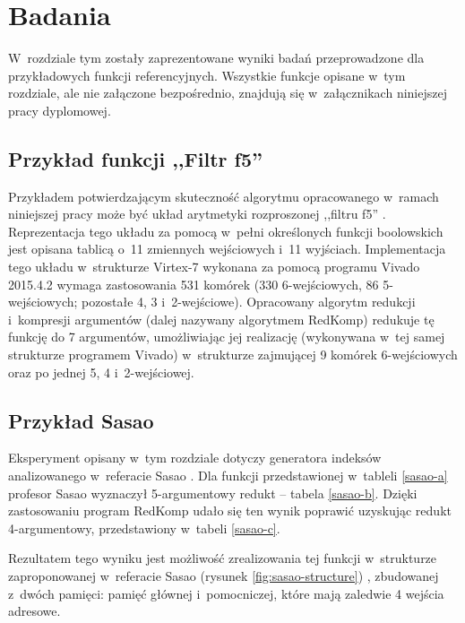\chapter{Badania}
\label{chapter:research}

W~rozdziale tym zostały zaprezentowane wyniki badań przeprowadzone dla przykładowych funkcji referencyjnych.
Wszystkie funkcje opisane w~tym rozdziale,
ale nie załączone bezpośrednio,
znajdują się w~załącznikach niniejszej pracy dyplomowej.

\section{Przykład funkcji ,,Filtr f5''}

Przykładem potwierdzającym skuteczność algorytmu opracowanego w~ramach niniejszej pracy
może być układ arytmetyki rozproszonej \cite{memory-capacity} ,,filtru f5'' \cite{nine-filters}.
Reprezentacja tego układu za pomocą w~pełni określonych funkcji boolowskich
jest opisana tablicą o~11 zmiennych wejściowych i~11 wyjściach.
Implementacja tego układu \cite{redukcja-kompresja} w~strukturze Virtex-7 wykonana za pomocą programu Vivado 2015.4.2
wymaga zastosowania 531 komórek (330 6-wejściowych, 86 5-wejściowych; pozostałe 4, 3 i~2-wejściowe).
Opracowany algorytm redukcji i~kompresji argumentów (dalej nazywany algorytmem RedKomp)
redukuje tę funkcję do 7 argumentów,
umożliwiając jej realizację
(wykonywana w~tej samej strukturze programem Vivado)
w~strukturze zajmującej 9 komórek 6-wejściowych oraz po jednej 5, 4 i~2-wejściowej.

\section{Przykład Sasao}

Eksperyment opisany w~tym rozdziale dotyczy generatora indeksów analizowanego w~referacie Sasao \cite{sasao-workshop}.
Dla funkcji przedstawionej w~tableli \ref{sasao-a} profesor Sasao wyznaczył 5-argumentowy redukt – tabela \ref{sasao-b}.
Dzięki zastosowaniu program RedKomp udało się ten wynik poprawić uzyskując redukt 4-argumentowy,
przedstawiony w~tabeli \ref{sasao-c}.



Rezultatem tego wyniku jest możliwość zrealizowania tej funkcji w~strukturze zaproponowanej w~referacie Sasao (rysunek \ref{fig:sasao-structure}) \cite{sasao-workshop},
zbudowanej z~dwóch pamięci: pamięć głównej i~pomocniczej,
które mają zaledwie 4 wejścia adresowe.


